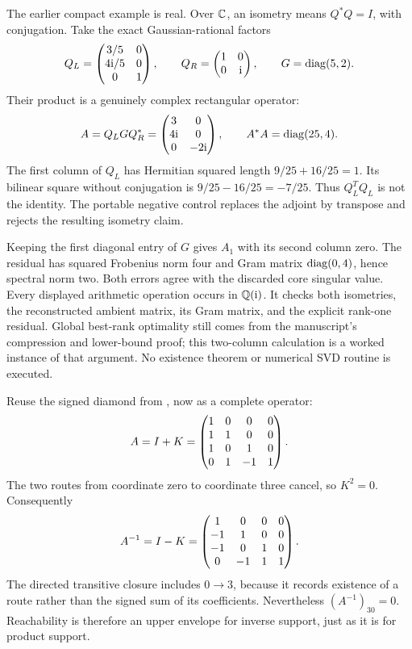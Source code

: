 The earlier compact example is real. Over $\mathbb C$, an isometry means $Q^*Q=I$, with conjugation. Take the exact Gaussian-rational factors
\[
Q_L=\begin{pmatrix}3/5&0\\4\mathrm i/5&0\\0&1\end{pmatrix},\qquad
Q_R=\begin{pmatrix}1&0\\0&\mathrm i\end{pmatrix},\qquad G=\operatorname{diag}(5,2).
\]
Their product is a genuinely complex rectangular operator:
\[
A=Q_LGQ_R^*=\begin{pmatrix}3&0\\4\mathrm i&0\\0&-2\mathrm i\end{pmatrix},
\qquad A^*A=\operatorname{diag}(25,4).
\]
The first column of $Q_L$ has Hermitian squared length $9/25+16/25=1$. Its bilinear square without conjugation is $9/25-16/25=-7/25$. Thus $Q_L^TQ_L$ is not the identity. The portable negative control replaces the adjoint by transpose and rejects the resulting isometry claim.

Keeping the first diagonal entry of $G$ gives $A_1$ with its second column zero. The residual has squared Frobenius norm four and Gram matrix $\operatorname{diag}(0,4)$, hence spectral norm two. Both errors agree with the discarded core singular value. Every displayed arithmetic operation occurs in $\mathbb Q(\mathrm i)$.
It checks both isometries, the reconstructed ambient matrix, its Gram matrix, and the explicit rank-one residual. Global best-rank optimality still comes from the manuscript's compression and lower-bound proof; this two-column calculation is a worked instance of that argument. No existence theorem or numerical SVD routine is executed.

Reuse the signed diamond from , now as a complete operator:
\[
A=I+K=\begin{pmatrix}1&0&0&0\\1&1&0&0\\1&0&1&0\\0&1&-1&1\end{pmatrix}.
\]
The two routes from coordinate zero to coordinate three cancel, so $K^2=0$. Consequently
\[
A^{-1}=I-K=\begin{pmatrix}1&0&0&0\\-1&1&0&0\\-1&0&1&0\\0&-1&1&1\end{pmatrix}.
\]
The directed transitive closure includes $0\to3$, because it records existence of a route rather than the signed sum of its coefficients. Nevertheless $(A^{-1})_{30}=0$. Reachability is therefore an upper envelope for inverse support, just as it is for product support.

